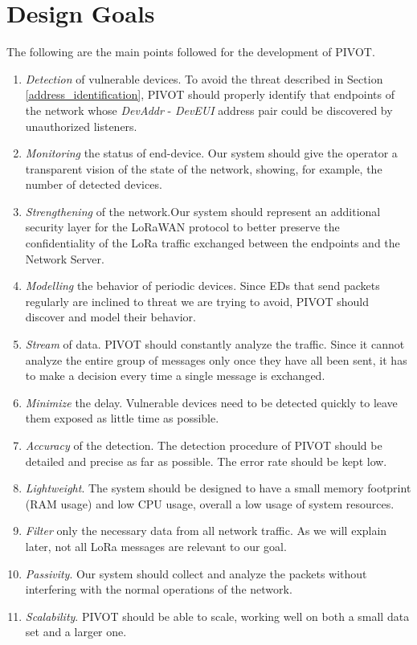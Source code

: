 \section{Design Goals}
\label{goals}
The following are the main points followed for the development of PIVOT.
\begin{enumerate}
	\item \textit {Detection} of vulnerable devices. To avoid the threat described in Section \ref {address_identification}, PIVOT should properly identify that endpoints of the network whose \textit {DevAddr} - \textit {DevEUI} address pair could be discovered by unauthorized listeners.
	\item \textit{Monitoring} the status of end-device. Our system should give the operator a transparent vision of the state of the network, showing, for example, the number of detected devices. 
	\item \textit{Strengthening} of the network.Our system should represent an additional security layer for the LoRaWAN protocol to better preserve the confidentiality of the LoRa traffic exchanged between the endpoints and the Network Server.
	\item \textit{Modelling} the behavior of periodic devices. Since EDs that send packets regularly are inclined to threat we are trying to avoid, PIVOT should discover and model their behavior.
	\item \textit{Stream} of data. PIVOT should constantly analyze the traffic. Since it cannot analyze the entire group of messages only once they have all been sent, it has to make a decision every time a single message is exchanged.
	\item \textit{Minimize} the delay. Vulnerable devices need to be detected quickly to leave them exposed as little time as possible.
	\item \textit{Accuracy} of the detection. The detection procedure of PIVOT should be detailed and precise as far as possible. The error rate should be kept low.
	\item \textit{Lightweight}. The system should be designed to have a small memory footprint (RAM usage) and low CPU usage, overall a low usage of system resources.
	\item \textit{Filter} only the necessary data from all network traffic. As we will explain later, not all LoRa messages are relevant to our goal.
	\item \textit{Passivity}. Our system should collect and analyze the packets without interfering with the normal operations of the network.
	\item \textit{Scalability}. PIVOT should be able to scale, working well on both a small data set and a larger one.
\end{enumerate}

